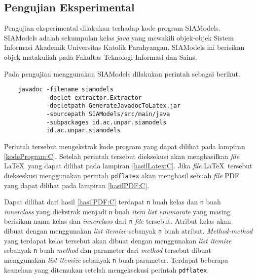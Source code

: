 \subsection{Pengujian Eksperimental}
\label{sec:pengujian eksperimental}
Pengujian eksperimental dilakukan terhadap kode program SIAModels. SIAModels adalah sekumpulan kelas {\it java} yang mewakili objek-objek Sistem Informasi Akademik Universitas Katolik Parahyangan. SIAModels ini berisikan objek matakuliah pada Fakultas Teknologi Informasi dan Sains.

Pada pengujian menggunakan SIAModels dilakukan perintah sebagai berikut.

\begin{verbatim}
	javadoc -filename siamodels
	        -doclet extractor.Extractor
	        -docletpath GenerateJavadocToLatex.jar
	        -sourcepath SIAModels/src/main/java
	        -subpackages id.ac.unpar.siamodels
	        id.ac.unpar.siamodels
\end{verbatim}

Perintah tersebut mengekstrak kode program yang dapat dilihat pada lampiran \ref{kodeProgram:C}. Setelah perintah tersebut dieksekusi akan menghasilkan {\it file} \LaTeX\ yang dapat dilihat pada lampiran \ref{hasilLatex:C}. Jika {\it file} \LaTeX\ tersebut diekseskusi menggunakan perintah {\tt pdflatex} akan menghasil sebuah {\it file} PDF yang dapat dilihat pada lampiran \ref{hasilPDF:C}.

Dapat dilihat dari hasil \ref{hasilPDF:C} terdapat {\tt n} buah kelas dan {\tt n} buah {\it innerclass} yang diekstrak menjadi {\tt n} buah {\it item list enumarate} yang masing berisikan nama kelas dan {\it innerclass} dari {\tt n} {\it file} tersebut. Atribut kelas akan dibuat dengan menggunakan {\it list itemize} sebanyak {\tt n} buah atribut. {\it Method-method} yang terdapat kelas tersebut akan dibuat dengan menggunakan {\it list itemize} sebanyak {\tt n} buah {\it method} dan parameter dari {\it method} tersebut dibuat menggunakan {\it list itemize} sebanyak {\tt n} buah parameter. Terdapat beberapa keanehan yang ditemukan setelah mengeksekusi perintah {\tt pdflatex}.

